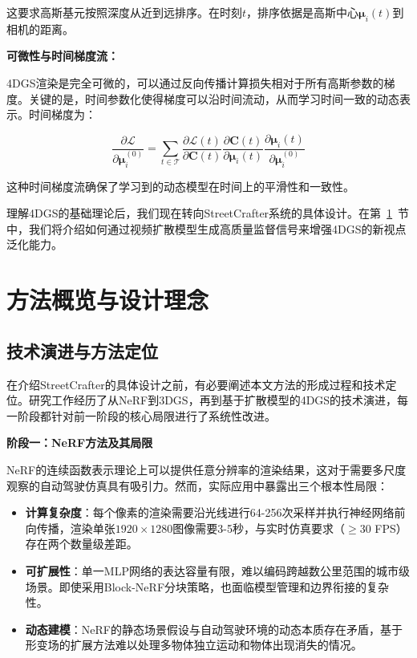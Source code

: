 这要求高斯基元按照深度从近到远排序。在时刻$t$，排序依据是高斯中心$\boldsymbol{\mu}_i(t)$到相机的距离。

\textbf{可微性与时间梯度流：}

4DGS渲染是完全可微的，可以通过反向传播计算损失相对于所有高斯参数的梯度。关键的是，时间参数化使得梯度可以沿时间流动，从而学习时间一致的动态表示。时间梯度为：

\begin{equation}
\frac{\partial \mathcal{L}}{\partial \boldsymbol{\mu}_i^{(0)}} = \sum_{t \in \mathcal{T}} \frac{\partial \mathcal{L}(t)}{\partial \mathbf{C}(t)} \frac{\partial \mathbf{C}(t)}{\partial \boldsymbol{\mu}_i(t)} \frac{\partial \boldsymbol{\mu}_i(t)}{\partial \boldsymbol{\mu}_i^{(0)}}
\label{eq:temporal_gradient}
\end{equation}

这种时间梯度流确保了学习到的动态模型在时间上的平滑性和一致性。

理解4DGS的基础理论后，我们现在转向StreetCrafter系统的具体设计。在第~\ref{sec:method_overview}~节中，我们将介绍如何通过视频扩散模型生成高质量监督信号来增强4DGS的新视点泛化能力。

\section{方法概览与设计理念}
\label{sec:method_overview}

\subsection{技术演进与方法定位}

在介绍StreetCrafter的具体设计之前，有必要阐述本文方法的形成过程和技术定位。研究工作经历了从NeRF到3DGS，再到基于扩散模型的4DGS的技术演进，每一阶段都针对前一阶段的核心局限进行了系统性改进。

\textbf{阶段一：NeRF方法及其局限}

NeRF的连续函数表示理论上可以提供任意分辨率的渲染结果，这对于需要多尺度观察的自动驾驶仿真具有吸引力。然而，实际应用中暴露出三个根本性局限：

\begin{itemize}
\item \textbf{计算复杂度}：每个像素的渲染需要沿光线进行64-256次采样并执行神经网络前向传播，渲染单张$1920 \times 1280$图像需要3-5秒，与实时仿真要求（$\geq$30 FPS）存在两个数量级差距。
\item \textbf{可扩展性}：单一MLP网络的表达容量有限，难以编码跨越数公里范围的城市级场景。即使采用Block-NeRF分块策略，也面临模型管理和边界衔接的复杂性。
\item \textbf{动态建模}：NeRF的静态场景假设与自动驾驶环境的动态本质存在矛盾，基于形变场的扩展方法难以处理多物体独立运动和物体出现消失的情况。
\end{itemize}

